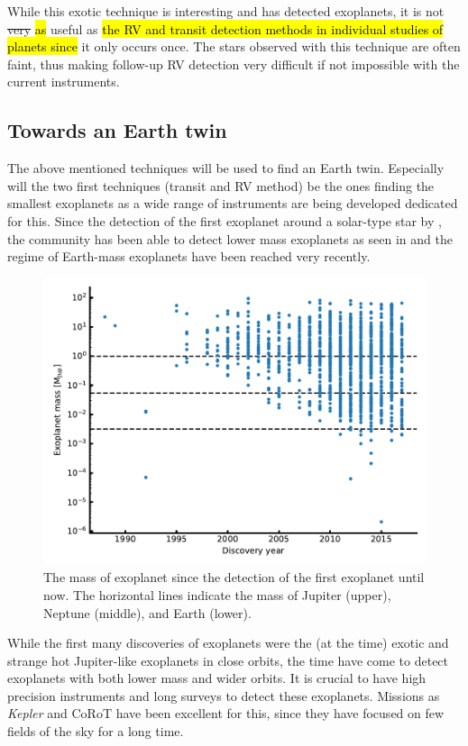While this exotic technique is interesting and has detected exoplanets, it is not \st{very} \hl{as}
useful as \hl{the RV and transit detection methods in individual studies of planets since} it only
occurs once. The stars observed with this technique are often faint, thus making follow-up RV
detection very difficult if not impossible with the current instruments.


\subsection{Towards an Earth twin}

The above mentioned techniques will be used to find an Earth twin. Especially will the two first
techniques (transit and RV method) be the ones finding the smallest exoplanets as a wide range of
instruments are being developed dedicated for this. Since the detection of the first exoplanet
around a solar-type star by \citet{Mayor1995}, the community has been able to detect lower mass
exoplanets as seen in  and the regime of Earth-mass exoplanets have been
reached very recently.

\begin{figure}[htpb!]
    \centering
    \includegraphics[width=0.8\linewidth]{figures/exoplanetMass.pdf}
    \caption{The mass of exoplanet since the detection of the first exoplanet until now. The
             horizontal lines indicate the mass of Jupiter (upper), Neptune (middle), and Earth
             (lower).}
    \label{fig:exoplanetMass}
\end{figure}

While the first many discoveries of exoplanets were the (at the time) exotic and strange hot
Jupiter-like exoplanets in close orbits, the time have come to detect exoplanets with both lower
mass and wider orbits. It is crucial to have high precision instruments and long surveys to detect
these exoplanets. Missions as \emph{Kepler} and CoRoT have been excellent for this, since they have
focused on few fields of the sky for a long time.


